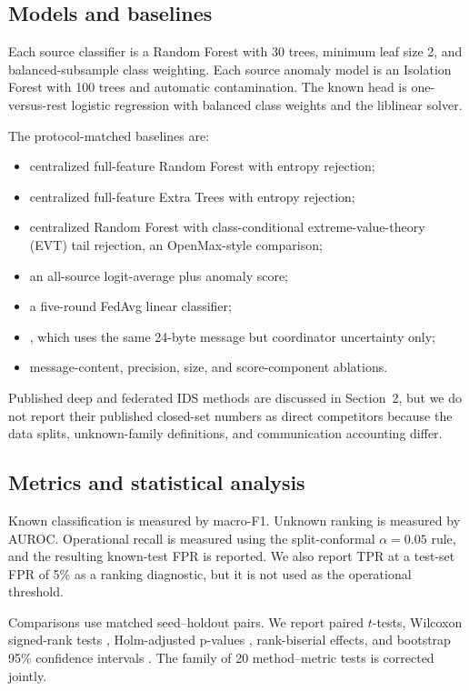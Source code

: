 \subsection{Models and baselines}

Each source classifier is a Random Forest with 30 trees, minimum leaf size 2, and balanced-subsample class weighting. Each source anomaly model is an Isolation Forest with 100 trees and automatic contamination. The known head is one-versus-rest logistic regression with balanced class weights and the liblinear solver.

The protocol-matched baselines are:
\begin{itemize}
    \item centralized full-feature Random Forest with entropy rejection;
    \item centralized full-feature Extra Trees with entropy rejection;
    \item centralized Random Forest with class-conditional extreme-value-theory (EVT) tail rejection, an OpenMax-style comparison;
    \item an all-source logit-average plus anomaly score;
    \item a five-round FedAvg linear classifier;
    \item \dhmethod{}, which uses the same 24-byte message but coordinator uncertainty only;
    \item message-content, precision, size, and score-component ablations.
\end{itemize}
Published deep and federated IDS methods are discussed in Section~2, but we do not report their published closed-set numbers as direct competitors because the data splits, unknown-family definitions, and communication accounting differ.

\subsection{Metrics and statistical analysis}

Known classification is measured by macro-F1. Unknown ranking is measured by AUROC. Operational recall is measured using the split-conformal $\alpha=0.05$ rule, and the resulting known-test FPR is reported. We also report TPR at a test-set FPR of 5\% as a ranking diagnostic, but it is not used as the operational threshold.

Comparisons use matched seed--holdout pairs. We report paired $t$-tests, Wilcoxon signed-rank tests \cite{wilcoxon1945}, Holm-adjusted p-values \cite{holm1979}, rank-biserial effects, and bootstrap 95\% confidence intervals \cite{efron1993bootstrap}. The family of 20 method--metric tests is corrected jointly.

